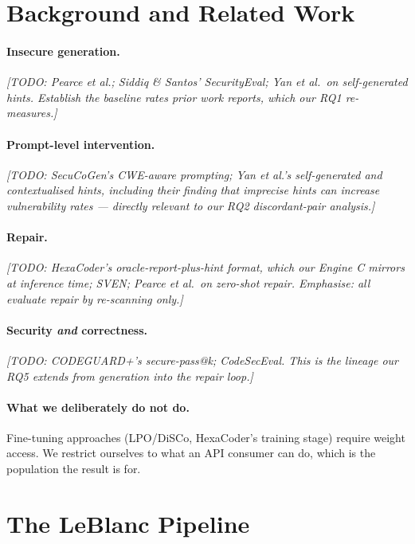 \documentclass[10pt,conference]{article}
\newcommand{\TODO}[1]{{\color{placeholderred}\textit{[TODO: #1]}}}
\begin{document}
\section{Background and Related Work}

\paragraph{Insecure generation.} \TODO{Pearce et al.; Siddiq \& Santos'
SecurityEval; Yan et al.\ on self-generated hints. Establish the baseline rates
prior work reports, which our RQ1 re-measures.}

\paragraph{Prompt-level intervention.} \TODO{SecuCoGen's CWE-aware prompting;
Yan et al.'s self-generated and contextualised hints, including their finding
that imprecise hints can \emph{increase} vulnerability rates --- directly
relevant to our RQ2 discordant-pair analysis.}

\paragraph{Repair.} \TODO{HexaCoder's oracle-report-plus-hint format, which our
Engine C mirrors at inference time; SVEN; Pearce et al.\ on zero-shot repair.
Emphasise: all evaluate repair by re-scanning only.}

\paragraph{Security \emph{and} correctness.} \TODO{CODEGUARD+'s secure-pass@k;
CodeSecEval. This is the lineage our RQ5 extends from generation into the repair
loop.}

\paragraph{What we deliberately do not do.} Fine-tuning approaches
(LPO/DiSCo, HexaCoder's training stage) require weight access. We restrict
ourselves to what an API consumer can do, which is the population the result is
for.

\section{The LeBlanc Pipeline}
\end{document}
